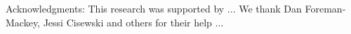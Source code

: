 \documentclass{aastex6}
\begin{document}
Acknowledgments: This research was supported by ... We thank
Dan Foreman-Mackey, Jessi Cisewski and others for their help ...

\begin{thebibliography}{99} 



\end{thebibliography}


\clearpage


\end{document}
